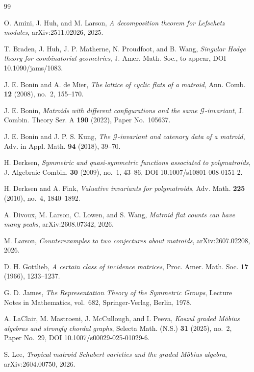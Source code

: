 \documentclass[11pt]{amsart}
\theoremstyle{definition}
\theoremstyle{remark}
\begin{document}
\begin{thebibliography}{99}

O. Amini, J. Huh, and M. Larson,
\emph{A decomposition theorem for Lefschetz modules},
arXiv:2511.02026, 2025.

T. Braden, J. Huh, J. P. Matherne, N. Proudfoot, and B. Wang,
\emph{Singular Hodge theory for combinatorial geometries},
J. Amer. Math. Soc., to appear, DOI 10.1090/jams/1083.

J. E. Bonin and A. de Mier,
\emph{The lattice of cyclic flats of a matroid},
Ann. Comb. \textbf{12} (2008), no.~2, 155--170.

J. E. Bonin,
\emph{Matroids with different configurations and the same $\mathcal G$-invariant},
J. Combin. Theory Ser. A \textbf{190} (2022), Paper No.~105637.

J. E. Bonin and J. P. S. Kung,
\emph{The $\mathcal G$-invariant and catenary data of a matroid},
Adv. in Appl. Math. \textbf{94} (2018), 39--70.

H. Derksen,
\emph{Symmetric and quasi-symmetric functions associated to polymatroids},
J. Algebraic Combin. \textbf{30} (2009), no.~1, 43--86,
DOI 10.1007/s10801-008-0151-2.

H. Derksen and A. Fink,
\emph{Valuative invariants for polymatroids},
Adv. Math. \textbf{225} (2010), no.~4, 1840--1892.

A. Divoux, M. Larson, C. Lowen, and S. Wang,
\emph{Matroid flat counts can have many peaks},
arXiv:2608.07342, 2026.

M. Larson,
\emph{Counterexamples to two conjectures about matroids},
arXiv:2607.02208, 2026.


D. H. Gottlieb,
\emph{A certain class of incidence matrices},
Proc. Amer. Math. Soc. \textbf{17} (1966), 1233--1237.

G. D. James,
\emph{The Representation Theory of the Symmetric Groups},
Lecture Notes in Mathematics, vol.~682, Springer-Verlag, Berlin, 1978.

A. LaClair, M. Mastroeni, J. McCullough, and I. Peeva,
\emph{Koszul graded M\"obius algebras and strongly chordal graphs},
Selecta Math. (N.S.) \textbf{31} (2025), no.~2, Paper No.~29,
DOI 10.1007/s00029-025-01029-6.

S. Lee,
\emph{Tropical matroid Schubert varieties and the graded M\"obius algebra},
arXiv:2604.00750, 2026.


\end{thebibliography}
\end{document}
